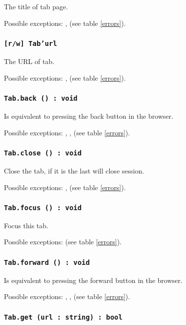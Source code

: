 The title of tab page.

Possible exceptions: ,  (see table \ref{errors}).

\subsubsection{\texttt{[r/w] Tab'url}}

The URL of tab.

Possible exceptions: ,  (see table \ref{errors}).

\subsubsection{\texttt{Tab.back () : void}}

Is equivalent to pressing the back button in the browser.

Possible exceptions: , ,  (see table \ref{errors}).

\subsubsection{\texttt{Tab.close () : void}}

Close the tab, if it is the last will close session.

Possible exceptions: ,  (see table \ref{errors}).

\subsubsection{\texttt{Tab.focus () : void}}

Focus this tab.

Possible exceptions:  (see table \ref{errors}).

\subsubsection{\texttt{Tab.forward () : void}}

Is equivalent to pressing the forward button in the browser.

Possible exceptions: , ,  (see table \ref{errors}).

\subsubsection{\texttt{Tab.get (url : string) : bool}}

